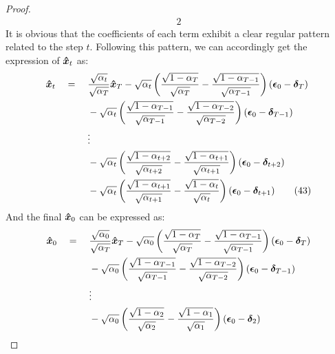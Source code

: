 \documentclass{article}
\newtheorem{proof}{Proof}
\begin{document}
\begin{proof}
\begin{alignat}{2}
\end{alignat}
It is obvious that the coefficients of each term exhibit a clear regular pattern related to the step $t$. Following this pattern, we can accordingly get the expression of $\boldsymbol{\Hat{x}}_{t}$ as:
\begin{alignat}{3}
&\boldsymbol{\Hat{x}}_{t} &&= \; && \frac{\sqrt{\alpha_{t}}}{\sqrt{\alpha_{T}}} \boldsymbol{\Hat{x}}_{T} \notag - {\sqrt{\alpha_{t}} \left(\frac{\sqrt{1-\alpha_{T}}}{\sqrt{\alpha_{T}}} - \frac{\sqrt{1-\alpha_{T-1}}}{\sqrt{\alpha_{T-1}}} \right) \left( \boldsymbol{\epsilon}_0 - \boldsymbol{\delta}_T \right)} \notag \\
& && && - {\sqrt{\alpha_{t}} \left(\frac{\sqrt{1-\alpha_{T-1}}}{\sqrt{\alpha_{T-1}}} - \frac{\sqrt{1-\alpha_{T-2}}}{\sqrt{\alpha_{T-2}}}\right) \left( \boldsymbol{\epsilon}_0 - \boldsymbol{\delta}_{T-1} \right) } \notag \\
& && && \vdots \notag \\
& && && - {\sqrt{\alpha_{t}} \left(\frac{\sqrt{1-\alpha_{t+2}}}{\sqrt{\alpha_{t+2}}} - \frac{\sqrt{1-\alpha_{t+1}}}{\sqrt{\alpha_{t+1}}}\right) \left( \boldsymbol{\epsilon}_0 - \boldsymbol{\delta}_{t+2} \right) } \notag \\
& && && -{\sqrt{\alpha_{t}} \left(\frac{\sqrt{1-\alpha_{t+1}}}{\sqrt{\alpha_{t+1}}} - \frac{\sqrt{1-\alpha_{t}}}{\sqrt{\alpha_{t}}}\right) \left( \boldsymbol{\epsilon}_0 - \boldsymbol{\delta}_{t+1} \right)} \tag{43} \label{apdx_eq:29}
\end{alignat}
And the final $\boldsymbol{\Hat{x}}_{0}$ can be expressed as: 
\begin{alignat}{3}
&\boldsymbol{\Hat{x}}_{0} &&= \; && \frac{\sqrt{\alpha_{0}}}{\sqrt{\alpha_{T}}} \boldsymbol{\Hat{x}}_{T} \notag - {\sqrt{\alpha_{0}} \left(\frac{\sqrt{1-\alpha_{T}}}{\sqrt{\alpha_{T}}} - \frac{\sqrt{1-\alpha_{T-1}}}{\sqrt{\alpha_{T-1}}} \right) \left( \boldsymbol{\epsilon}_0 - \boldsymbol{\delta}_T \right)} \notag \\
& && && - {\sqrt{\alpha_{0}} \left(\frac{\sqrt{1-\alpha_{T-1}}}{\sqrt{\alpha_{T-1}}} - \frac{\sqrt{1-\alpha_{T-2}}}{\sqrt{\alpha_{T-2}}}\right) \left( \boldsymbol{\epsilon}_0 - \boldsymbol{\delta}_{T-1} \right) } \notag \\
& && && \vdots \notag \\
& && && - {\sqrt{\alpha_{0}} \left(\frac{\sqrt{1-\alpha_{2}}}{\sqrt{\alpha_{2}}} - \frac{\sqrt{1-\alpha_{1}}}{\sqrt{\alpha_{1}}}\right) \left( \boldsymbol{\epsilon}_0 - \boldsymbol{\delta}_{2} \right) } \notag \\

\end{alignat}
\end{proof}
\end{document}
